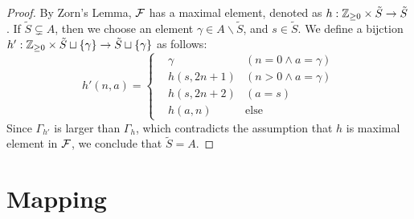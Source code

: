 \begin{proof}
  By Zorn's Lemma, ${\cal F}$ has a maximal element, denoted as $h: \mathbb Z_{\geq 0} \times \tilde{S} \to \tilde{S}$. If $\tilde{S} \subsetneq A$, then we choose an element $\gamma \in A \smallsetminus \tilde{S}$, and $s \in \tilde{S}$. We define a bijction $h': \mathbb Z_{\geq 0} \times \tilde{S} \sqcup \{ \gamma \} \to \tilde{S} \sqcup \{ \gamma \}$ as follows:
  \begin{equation*}
    h'(n, a) = \left\{
      \begin{aligned}
        & \gamma &(n=0 \land a = \gamma) \\
        & h(s, 2n+1) &(n>0 \land a = \gamma ) \\
        & h(s, 2n+2) &(a = s) \\
        & h(a, n) &\text{else}
      \end{aligned} 
    \right.
  \end{equation*}
  Since $\Gamma_{h'}$ is larger than $\Gamma_h$, which contradicts the assumption that $h$ is maximal element in ${\cal F}$, we conclude that $\tilde{S} = A$.
\end{proof}



\section{Mapping}


